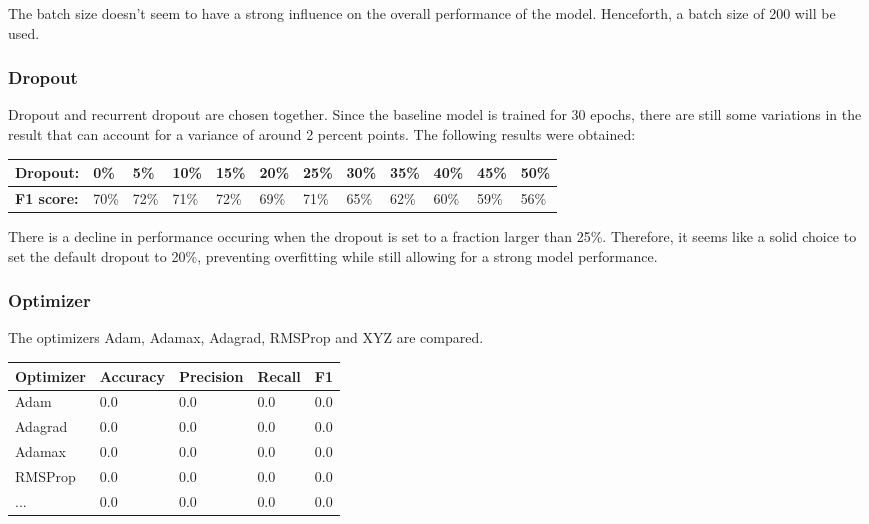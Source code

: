 \documentclass[
	a4paper,
	pagesize,
	pdftex,
	12pt,
	twoside, %
	BCOR=5mm, %
	ngerman,
	fleqn,
	final,
	]{scrartcl}
\begin{document}
The batch size doesn't seem to have a strong influence on the overall performance of the model. Henceforth, a batch size of 200 will be used.

\subsubsection{Dropout}

Dropout and recurrent dropout are chosen together. Since the baseline model is trained for 30 epochs, there are still some variations in the result that can account for a variance of around 2 percent points. The following results were obtained:

\begin{tabular} { | p{2cm} || p{0.8cm} | p{0.8cm} | p{0.8cm} | p{0.8cm}  | p{0.8cm} | p{0.8cm} | p{0.8cm} | p{0.8cm} | p{0.8cm} | p{0.8cm} | p{0.8cm} |}
\hline
\textbf{Dropout:}  & 0\% & 5\% & 10\% & 15\%   & 20\% & 25\% & 30\%   & 35\% & 40\% & 45\% & 50\% \\   
\hline
\textbf{F1 score:} & 70\% & 72\% & 71\% & 72\% & 69\% & 71\% & 65\% & 62\% & 60\% & 59\% & 56\% \\
\hline
\hline
\end{tabular}

There is a decline in performance occuring when the dropout is set to a fraction larger than 25\%. Therefore, it seems like a solid choice to set the default dropout to 20\%, preventing overfitting while still allowing for a strong model performance.



\subsubsection{Optimizer}

The optimizers Adam, Adamax, Adagrad, RMSProp and XYZ are compared. 

\begin{tabular}{ | p{2cm} || p{2cm}|p{2cm}|p{2cm}|p{2cm}|  }
	\hline
	Optimizer & Accuracy & Precision & Recall & F1 \\
	\hline
	Adam & 0.0 &  0.0 &  0.0 &  0.0 \\
	Adagrad & 0.0 &  0.0 &  0.0 &  0.0 \\
	Adamax & 0.0 &  0.0 &  0.0 &  0.0 \\
	RMSProp & 0.0 &  0.0 &  0.0 &  0.0 \\
	... & 0.0 &  0.0 &  0.0 &  0.0 \\
	\hline
	\hline
\end{tabular}
\end{document}
